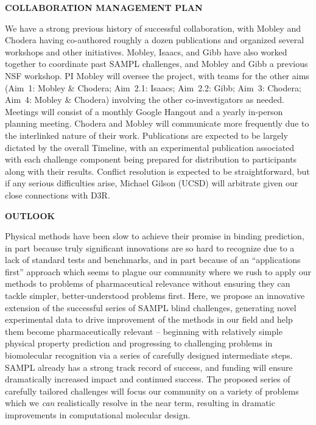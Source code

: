 \documentclass[11pt]{article}
\begin{document}

{\Large \bf COLLABORATION MANAGEMENT PLAN}

We have a strong previous history of successful collaboration, with Mobley and Chodera having co-authored roughly a dozen publications and organized several workshops and other initiatives.
Mobley, Isaacs, and Gibb have also worked together to coordinate past SAMPL challenges, and Mobley and Gibb a previous NSF workshop. 
PI Mobley will oversee the project, with teams for the other aims (Aim~1: Mobley \& Chodera; Aim~2.1: Isaacs; Aim~2.2: Gibb; Aim~3: Chodera; Aim~4: Mobley \& Chodera) involving the other co-investigators as needed.
Meetings will consist of a monthly Google Hangout and a yearly in-person planning meeting. %
Chodera and Mobley will communicate more frequently due to the interlinked nature of their work.
Publications are expected to be largely dictated by the overall Timeline, with an experimental publication associated with each challenge component being prepared for distribution to participants along with their results.
Conflict resolution is expected to be straightforward, but if any serious difficulties arise, Michael Gilson (UCSD) will arbitrate given our close connections with D3R.

{\Large \bf OUTLOOK}

Physical methods have been slow to achieve their promise in binding prediction, in part because truly significant innovations are so hard to recognize due to a lack of standard tests and benchmarks, and in part because of an ``applications first'' approach which seems to plague our community where we rush to apply our methods to problems of pharmaceutical relevance without ensuring they can tackle simpler, better-understood problems first.
Here, we propose an innovative extension of the successful series of SAMPL blind challenges, generating novel experimental data to drive improvement of the methods in our field and help them become pharmaceutically relevant -- beginning with relatively simple physical property prediction and progressing to challenging problems in biomolecular recognition via a series of carefully designed intermediate steps.
SAMPL already has a strong track record of success, and funding will ensure dramatically increased impact and continued success.
The proposed series of carefully tailored challenges will focus our community on a variety of problems which we \emph{can} realistically resolve in the near term, resulting in dramatic improvements in computational molecular design.
\end{document}

